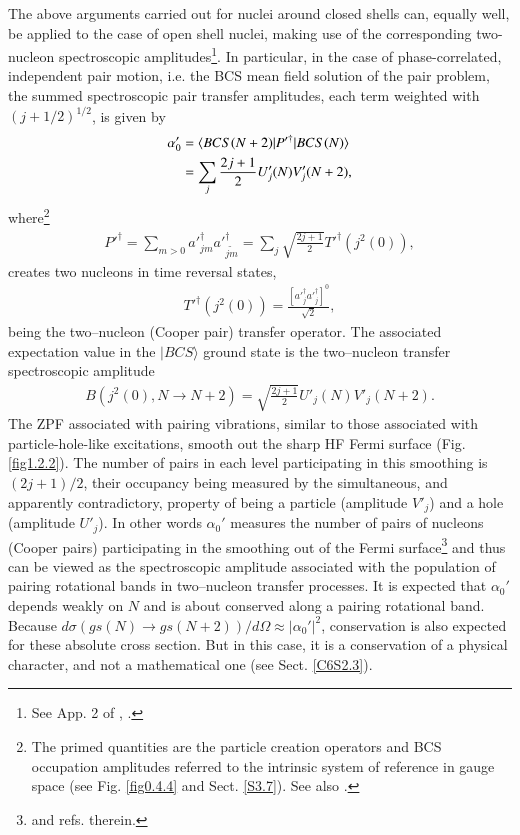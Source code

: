 The above arguments carried out for nuclei around closed shells can,  equally well, be applied to the case of open shell nuclei, making use of the corresponding two-nucleon spectroscopic amplitudes\footnote{See App. 2 of \cite{Broglia:73}, \cite{Yoshida:62}.}.
In particular, in the case of phase-correlated, independent pair motion, i.e. the BCS mean field solution of the pair problem, the summed spectroscopic pair transfer amplitudes, each term weighted with $(j+1/2)^{1/2}$, is given by
\begin{align}\label{eq1.2.14}
\nonumber \alpha_0'&=\langle {BCS(N+2)|P'^\dagger|BCS(N)} \rangle\\
&=\sum_{j}\frac{2j+1}{2}U'_j(N)V'_j(N+2),
\end{align}
where\footnote{The primed quantities are the particle creation operators and BCS occupation amplitudes referred to the intrinsic system of reference in gauge space (see  Fig. \ref{fig0.4.4} and Sect. \ref{S3.7}). See also \cite{Potel:13b}.}
\begin{align}\label{eq1.2.15}
P'^\dagger=\sum_{m>0}a'^\dagger_{jm}a'^\dagger_{\widetilde{jm}}=\sum_j\sqrt{\frac{2j+1}{2}}T'^{\dagger}(j^2(0)),
\end{align}
creates two nucleons in time reversal states, 
\begin{align}\label{eq1.2.16}
T'^{\dagger}(j^2(0))=\frac{\left[a'^\dagger_ja'^\dagger_j\right]^0}{\sqrt{2}},
\end{align}
being the two--nucleon (Cooper pair) transfer operator. The associated expectation value in the $|BCS\rangle$ ground state is the two--nucleon transfer spectroscopic amplitude  
\begin{align}\label{eq1.2.17}
B(j^2(0),N\to N+2)=\sqrt{\frac{2j+1}{2}}U'_j(N)V'_j(N+2).
\end{align}
The ZPF associated with pairing vibrations, similar to those associated with particle-hole-like excitations,  smooth out the sharp HF Fermi surface (Fig. \ref{fig1.2.2}). The number of pairs in each level participating in this smoothing is $(2j+1)/2$, their occupancy being measured by the simultaneous, and apparently contradictory, property of being a particle (amplitude $V'_j$) and a hole (amplitude $U'_j$). In other words $\alpha_0'$ measures the number of pairs of nucleons (Cooper pairs) participating in the smoothing out of the Fermi surface\footnote{\cite{Schrieffer:64,Potel:17} and refs. therein.} and thus can be viewed as the spectroscopic amplitude associated with the population of pairing rotational bands in two--nucleon transfer processes. It is expected that $\alpha_0'$ depends weakly on $N$ and is about conserved along a pairing rotational band. Because $d\sigma(gs(N)\rightarrow gs(N+2))/d\Omega\approx|\alpha_0'|^2$, conservation is also expected for these absolute cross section. But in this case, it is a conservation of a physical character, and not a mathematical one (see Sect. \ref{C6S2.3}). 


